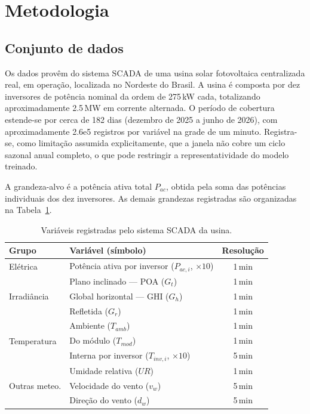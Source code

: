 \section{Metodologia}

\subsection{Conjunto de dados}

Os dados provêm do sistema SCADA de uma usina solar fotovoltaica centralizada real, em operação, localizada no Nordeste do Brasil. A usina é composta por dez inversores de potência nominal da ordem de 275\,kW cada, totalizando aproximadamente 2.5\,MW em corrente alternada. O período de cobertura estende-se por cerca de 182 dias (dezembro de 2025 a junho de 2026), com aproximadamente 2.6e5 registros por variável na grade de um minuto. Registra-se, como limitação assumida explicitamente, que a janela não cobre um ciclo sazonal anual completo, o que pode restringir a representatividade do modelo treinado.

A grandeza-alvo é a potência ativa total $P_{ac}$, obtida pela soma das potências individuais dos dez inversores. As demais grandezas registradas são organizadas na Tabela~\ref{tab:variaveis}.

\begin{table}[htbp]
\centering
\caption{Variáveis registradas pelo sistema SCADA da usina.}
\label{tab:variaveis}
\footnotesize
\singlespacing
\renewcommand{\arraystretch}{0.9}
\setlength{\tabcolsep}{4pt}
\begin{tabular}{p{3cm} p{6cm} c}
\toprule
\textbf{Grupo} & \textbf{Variável (símbolo)} & \textbf{Resolução} \\
\midrule
Elétrica & Potência ativa por inversor ($P_{ac,i}$, $\times 10$) & 1\,min \\
\midrule
\multirow{3}{*}{Irradiância} & Plano inclinado --- POA ($G_t$) & 1\,min \\
 & Global horizontal --- GHI ($G_h$) & 1\,min \\
 & Refletida ($G_r$) & 1\,min \\
\midrule
\multirow{3}{*}{Temperatura} & Ambiente ($T_{amb}$) & 1\,min \\
 & Do módulo ($T_{mod}$) & 1\,min \\
 & Interna por inversor ($T_{inv,i}$, $\times 10$) & 5\,min \\
\midrule
\multirow{3}{*}{Outras meteo.} & Umidade relativa ($UR$) & 1\,min \\
 & Velocidade do vento ($v_w$) & 5\,min \\
 & Direção do vento ($d_w$) & 5\,min \\
\bottomrule
\end{tabular}
\end{table}

